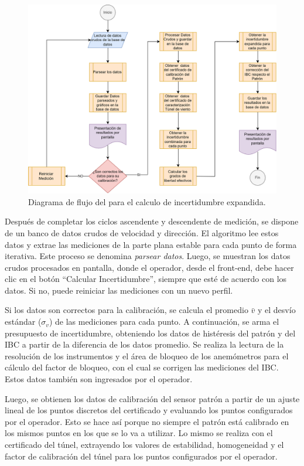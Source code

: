 \begin{figure}[H]
    \centering
    \includegraphics[width=0.9\linewidth]{Figuras/AplicacionWeb/backend/DiagramaFlujoCalculoIncertidumbre.png}
    \caption{Diagrama de flujo del para el calculo de incertidumbre expandida.}
    \label{fig:DiagramaFlujoCalculoIncertidumbre}
\end{figure}

Después de completar los ciclos ascendente y descendente de medición, se dispone de un banco de datos crudos de velocidad y dirección. El algoritmo lee estos datos y extrae las mediciones de la parte plana estable para cada punto de forma iterativa. Este proceso se denomina \textit{parsear datos}. Luego, se muestran los datos crudos procesados en pantalla, donde el operador, desde el front-end, debe hacer clic en el botón ``Calcular Incertidumbre'', siempre que esté de acuerdo con los datos. Si no, puede reiniciar las mediciones con un nuevo perfil.

Si los datos son correctos para la calibración, se calcula el promedio $\bar{v}$ y el desvío estándar ($\sigma_{v}$) de las mediciones para cada punto. A continuación, se arma el presupuesto de incertidumbre, obteniendo los datos de histéresis del patrón y del IBC a partir de la diferencia de los datos promedio. Se realiza la lectura de la resolución de los instrumentos y el área de bloqueo de los anemómetros para el cálculo del factor de bloqueo, con el cual se corrigen las mediciones del IBC. Estos datos también son ingresados por el operador.

Luego, se obtienen los datos de calibración del sensor patrón a partir de un ajuste lineal de los puntos discretos del certificado y evaluando los puntos configurados por el operador. Esto se hace así porque no siempre el patrón está calibrado en los mismos puntos en los que se lo va a utilizar. Lo mismo se realiza con el certificado del túnel, extrayendo los valores de estabilidad, homogeneidad y el factor de calibración del túnel para los puntos configurados por el operador.

